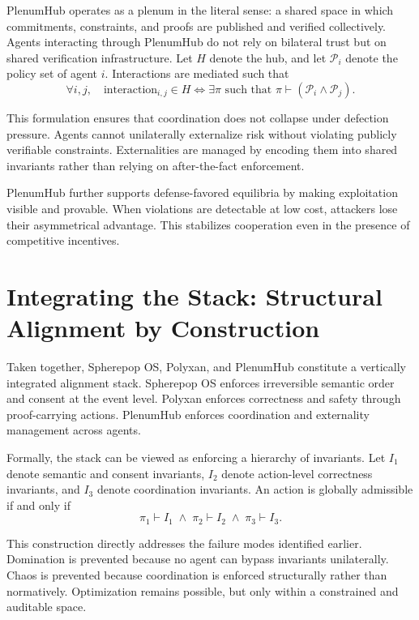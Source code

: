 \documentclass[11pt,oneside]{article}
\begin{document}
PlenumHub operates as a plenum in the literal sense: a shared space in which commitments, constraints, and proofs are published and verified collectively. Agents interacting through PlenumHub do not rely on bilateral trust but on shared verification infrastructure. Let \( H \) denote the hub, and let \( \mathcal{P}_i \) denote the policy set of agent \( i \). Interactions are mediated such that
\[
\forall i,j,\quad \text{interaction}_{i,j} \in H \iff \exists \pi \text{ such that } \pi \vdash (\mathcal{P}_i \wedge \mathcal{P}_j).
\]

This formulation ensures that coordination does not collapse under defection pressure. Agents cannot unilaterally externalize risk without violating publicly verifiable constraints. Externalities are managed by encoding them into shared invariants rather than relying on after-the-fact enforcement.

PlenumHub further supports defense-favored equilibria by making exploitation visible and provable. When violations are detectable at low cost, attackers lose their asymmetrical advantage. This stabilizes cooperation even in the presence of competitive incentives.

\section{Integrating the Stack: Structural Alignment by Construction}

Taken together, Spherepop OS, Polyxan, and PlenumHub constitute a vertically integrated alignment stack. Spherepop OS enforces irreversible semantic order and consent at the event level. Polyxan enforces correctness and safety through proof-carrying actions. PlenumHub enforces coordination and externality management across agents.

Formally, the stack can be viewed as enforcing a hierarchy of invariants. Let \( I_1 \) denote semantic and consent invariants, \( I_2 \) denote action-level correctness invariants, and \( I_3 \) denote coordination invariants. An action is globally admissible if and only if
\[
\pi_1 \vdash I_1 \;\wedge\; \pi_2 \vdash I_2 \;\wedge\; \pi_3 \vdash I_3.
\]

This construction directly addresses the failure modes identified earlier. Domination is prevented because no agent can bypass invariants unilaterally. Chaos is prevented because coordination is enforced structurally rather than normatively. Optimization remains possible, but only within a constrained and auditable space.
\end{document}
